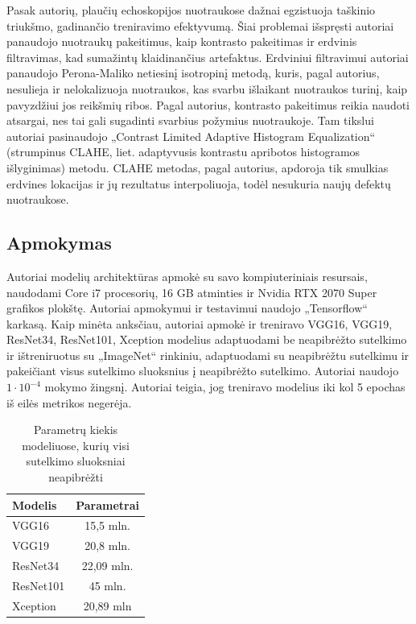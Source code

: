 \documentclass[fleqn]{VUMIFKompMagistrinis}
\begin{document}
Pasak autorių, plaučių echoskopijos nuotraukose dažnai egzistuoja taškinio triukšmo, gadinančio treniravimo efektyvumą. Šiai problemai išspręsti autoriai panaudojo nuotraukų pakeitimus, kaip kontrasto pakeitimas ir erdvinis filtravimas, kad sumažintų klaidinančius artefaktus. Erdviniui filtravimui autoriai panaudojo Perona-Maliko netiesinį isotropinį metodą, kuris, pagal autorius, nesulieja ir nelokalizuoja nuotraukos, kas svarbu išlaikant nuotraukos turinį, kaip pavyzdžiui jos reikšmių ribos. Pagal autorius, kontrasto pakeitimus reikia naudoti atsargai, nes tai gali sugadinti svarbius požymius nuotraukoje. Tam tikslui autoriai pasinaudojo „Contrast Limited Adaptive Histogram Equalization“ (strumpinus CLAHE, liet. adaptyvusis kontrastu apribotos histogramos išlyginimas) metodu. CLAHE metodas, pagal autorius, apdoroja tik smulkias erdvines lokacijas ir jų rezultatus interpoliuoja, todėl nesukuria naujų defektų nuotraukose. \cite{HASAN2023}

\subsection{Apmokymas}
Autoriai modelių architektūras apmokė su savo kompiuteriniais resursais, naudodami Core i7 procesorių, 16 GB atminties ir Nvidia RTX 2070 Super grafikos plokštę. Autoriai apmokymui ir testavimui naudojo „Tensorflow“ karkasą. Kaip minėta anksčiau, autoriai apmokė ir treniravo VGG16, VGG19, ResNet34, ResNet101, Xception modelius adaptuodami be neapibrėžto sutelkimo ir ištreniruotus su „ImageNet“ rinkiniu, adaptuodami su neapibrėžtu sutelkimu ir pakeičiant visus sutelkimo sluoksnius į neapibrėžto sutelkimo. Autoriai naudojo  \(1 \cdot 10^{-4}\) mokymo žingsnį. Autoriai teigia, jog treniravo modelius iki kol 5 epochas iš eilės metrikos negerėja. \cite{HASAN2023}

\begin{table}[H]\footnotesize
  \centering
\caption{Parametrų kiekis modeliuose, kurių visi sutelkimo sluoksniai neapibrėžti \cite{HASAN2023}}
\begin{tabular}{|l|c|}
\hline
Modelis      & Parametrai  \\ \hline
VGG16      & 15,5 mln.           \\
VGG19      & 20,8 mln.            \\
ResNet34   & 22,09 mln.             \\
ResNet101  & 45 mln.            \\
Xception   & 20,89 mln      \\ \hline
  \end{tabular}
  \label{tab:fuzzyparams}
\end{table}
\end{document}
